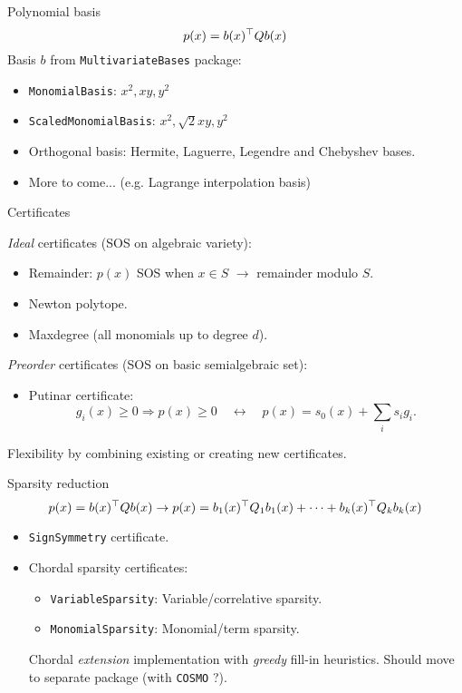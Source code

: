 \documentclass{beamer}
\begin{document}
\begin{frame}{Polynomial basis}
  \[ p(x) = b(x)^\top Q b(x) \]
  Basis $b$ from \texttt{MultivariateBases} package:
  \begin{itemize}
    \item \texttt{MonomialBasis}: $x^2, xy, y^2$
    \item \texttt{ScaledMonomialBasis}: $x^2, \sqrt{2} xy, y^2$
    \item Orthogonal basis: Hermite, Laguerre, Legendre and Chebyshev bases.
    \item More to come... (e.g. Lagrange interpolation basis)
  \end{itemize}
\end{frame}

\begin{frame}{Certificates}

  \emph{Ideal} certificates (SOS on algebraic variety):
  \begin{itemize}
    \item Remainder: $p(x)$ SOS when $x \in S$ $\to$ remainder modulo $S$.
    \item Newton polytope.
    \item Maxdegree (all monomials up to degree $d$).
  \end{itemize}
  \emph{Preorder} certificates (SOS on basic semialgebraic set):
  \begin{itemize}
    \item Putinar certificate:
      \[ g_i(x) \ge 0 \Rightarrow p(x) \ge 0 \quad \leftrightarrow \quad p(x) = s_0(x) + \sum_i s_i g_i. \]
  \end{itemize}

  \alert{Flexibility} by combining existing or creating new certificates.
\end{frame}

\begin{frame}{Sparsity reduction}
  \[ p(x) = b(x)^\top Q b(x) \to p(x) = b_1(x)^\top Q_1 b_1(x) + \cdots + b_k(x)^\top Q_k b_k(x) \]

  \begin{itemize}
    \item \texttt{SignSymmetry} certificate.
    \item \alert{Chordal} sparsity certificates:
      \begin{itemize}
        \item \texttt{VariableSparsity}: Variable/correlative sparsity.
        \item \texttt{MonomialSparsity}: Monomial/term sparsity.
      \end{itemize}
      \alert{Chordal} \emph{extension} implementation with \emph{greedy} fill-in heuristics.
      Should move to separate package (with \texttt{COSMO} ?).
  \end{itemize}
\end{frame}
\end{document}
